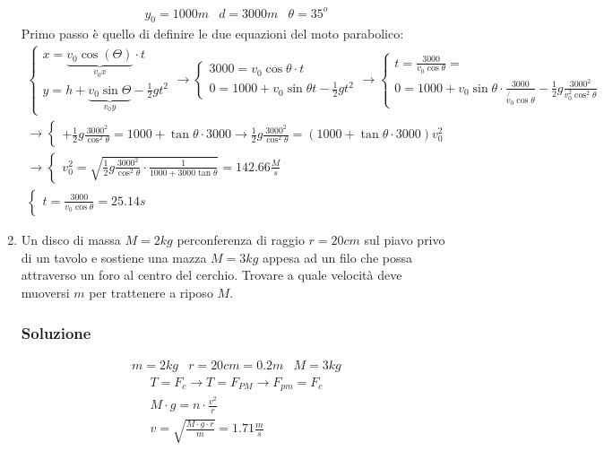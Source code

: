 \documentclass{report}
\begin{document}
\begin{enumerate}
\begin{equation*}
  \begin{matrix}
    y_0=1000m & d=3000m & \theta=35^o
  \end{matrix}
\end{equation*}
Primo passo è quello di definire le due equazioni del moto parabolico:
\begin{eqnarray*}
  \begin{cases}
    x=\underbrace{v_0\cos(\Theta)}_{v_0x}\cdot t\\
    y=h+\underbrace{v_0\sin\Theta}_{v_0y}-\frac{1}{2}gt^2
  \end{cases} \to
  \begin{cases}
    3000=v_0\cos\theta\cdot t\\
    0=1000+v_0\sin\theta t-\frac{1}{2}gt^2
  \end{cases}\to
  \begin{cases}
    t=\frac{3000}{v_0\cos\theta}=\\
    0=1000+v_0\sin\theta\cdot \frac{3000}{\not{v_0}\cos\theta}
    -\frac{1}{2}g\frac{3000^2}{v_0^2\cos^2\theta}
  \end{cases}\\
  \to
  \begin{cases}
    +\frac{1}{2}g\frac{3000^2}{\cos^2\theta}=1000+\tan\theta\cdot 3000 \to \frac{1}{2}g\frac{3000^2}{\cos^2\theta}=(1000+\tan \theta\cdot 3000)v_0^2
  \end{cases}\\
  \to
  \begin{cases}
    v_0^2=\sqrt{\frac{1}{2}g\frac{3000^2}{\cos^2\theta}\cdot \frac{1}{1000+3000\tan\theta}}=142.66\frac{M}{s}
  \end{cases}\\
  \begin{cases}
    t=\frac{3000}{v_0\cos\theta}=25.14s
  \end{cases}
\end{eqnarray*}
\item Un disco di massa $M=2kg$ perconferenza di raggio $r=20cm$ sul piavo privo di
  un tavolo e sostiene una mazza $M=3kg$ appesa ad un filo che possa attraverso un
  foro al centro del cerchio. Trovare a quale velocità deve muoversi $m$ per
  trattenere a riposo $M$.
  
\subsubsection{Soluzione}
\label{sec:sol10}
\begin{eqnarray*}
  m=2kg & r=20cm =0.2m & M=3kg
\end{eqnarray*}
\begin{eqnarray*}
  T=F_c\to T=F_{PM}\to F_{pm}=F_c\\
  M\cdot g=n\cdot \frac{v^2}{r}\\
  v=\sqrt{\frac{M\cdot g\cdot r}{m}}=1.71\frac{m}{s}
\end{eqnarray*}
\end{enumerate}
\end{document}
